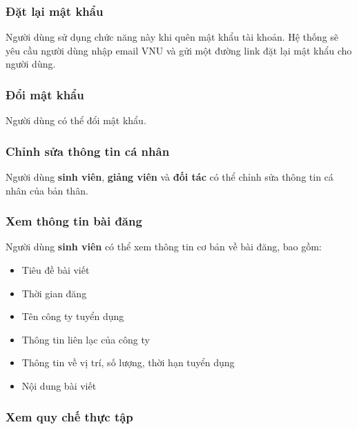 \documentclass[./../main.tex]{subfiles}
\begin{document}
\hypertarget{ux111ux1eb7t-lux1ea1i-mux1eadt-khux1ea9u}{%
	\subsubsection{Đặt lại mật
		khẩu}\label{ux111ux1eb7t-lux1ea1i-mux1eadt-khux1ea9u}}

Người dùng sử dụng chức năng này khi quên mật khẩu tài khoản. Hệ thống
sẽ yêu cầu người dùng nhập email VNU và gửi một đường link đặt lại mật
khẩu cho người dùng.

\hypertarget{ux111ux1ed5i-mux1eadt-khux1ea9u}{%
	\subsubsection{Đổi mật khẩu}\label{ux111ux1ed5i-mux1eadt-khux1ea9u}}

Người dùng có thể đổi mật khẩu.

\hypertarget{chux1ec9nh-sux1eeda-thuxf4ng-tin-cuxe1-nhuxe2n}{%
	\subsubsection{Chỉnh sửa thông tin cá
		nhân}\label{chux1ec9nh-sux1eeda-thuxf4ng-tin-cuxe1-nhuxe2n}}

Người dùng \textbf{sinh viên}, \textbf{giảng viên} và \textbf{đối tác}
có thể chỉnh sửa thông tin cá nhân của bản thân.

\hypertarget{xem-thuxf4ng-tin-buxe0i-ux111ux103ng}{%
	\subsubsection{Xem thông tin bài
		đăng}\label{xem-thuxf4ng-tin-buxe0i-ux111ux103ng}}

Người dùng \textbf{sinh viên} có thể xem thông tin cơ bản về bài đăng,
bao gồm:

\begin{itemize}
	\item Tiêu đề bài viết
	\item Thời gian đăng
	\item Tên công ty tuyển dụng
	\item Thông tin liên lạc của công ty
	\item Thông tin về vị trí, số lượng, thời hạn tuyển dụng
	\item Nội dung bài viết
\end{itemize}

\subsubsection{Xem quy chế thực tập}
\end{document}
